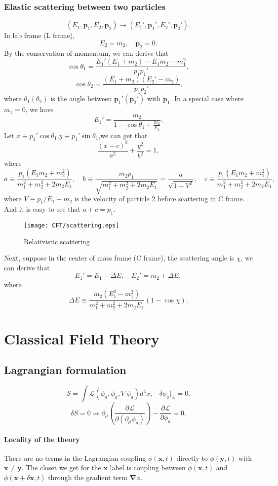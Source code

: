\subsection{Elastic scattering between two particles}
\[(E_1,\bm{p}_1,E_2,\bm{p}_2) \to (E_1',\bm{p}_1',E_2',\bm{p}_2').\]
In lab frame (L frame),
\[E_2 = m_2 , \quad \bm{p}_2 = 0.\]
By the conservation of momentum, we can derive that
\[\cos \theta_1 = \frac{E_1'(E_1+m_2)-E_1 m_2 - m_1^2}{p_1 p_1'},\]
\[\cos \theta_2 = \frac{(E_1+m_2)(E_2'-m_2)}{p_1 p_2'}.\]
where $\theta_1(\theta_2)$ is the angle between $\bm{p}_1'(\bm{p}_2')$ with $\bm{p}_1$.
In a special case where $m_1 =0$, we have
\[E_1' = \frac{m_2}{1-\cos\theta_1 + \frac{m_2}{E_1}}.\]
Let $x \equiv p_1'\cos\theta_1$,$y \equiv p_1'\sin\theta_1$,we can get that
\[\frac{(x-c)^2}{a^2}+\frac{y^2}{b^2}=1,\]
where
\[a \equiv \frac{p_1(E_1m_2+m_2^2)}{m_1^2 + m_2^2 + 2m_2 E_1}, \quad b \equiv \frac{m_2 p_1}{\sqrt{m_1^2 + m_2^2 + 2m_2 E_1}} = \frac{a}{\sqrt{1-V^2}} , \quad c \equiv \frac{ p_1(E_1m_2+m_1^2)}{m_1^2 + m_2^2 + 2m_2 E_1},\]
where $V \equiv p_1 / {E_1 + m_2}$ is the velocity of particle 2 before scattering in C frame. 
And it is easy to see that $a + c = p_1$.
\begin{figure}[!h]
	\centering
	\texttt{[image: CFT/scattering.eps]}
	\caption{Relativistic scattering}
\end{figure}
\noindent
Next, suppose in the center of mass frame (C frame), the scattering angle is $\chi$, we can derive that
\[E_1' = E_1 - \Delta E , \quad E_2' = m_2 + \Delta E,\]
where
\[\Delta E \equiv \frac{m_2(E_1^2-m_1^2)}{m_1^2 + m_2^2 + 2m_2E_1}(1-\cos\chi).\]

\chapter{Classical Field Theory}
\section{Lagrangian formulation}
\[S = \int \mathcal{L}(\phi_a,\dot{\phi}_a,\nabla \phi_a) d^4 x, \ \ \ \ \delta \phi_a |_{\Sigma} = 0.\]
\[\delta S = 0 \Rightarrow \partial_{\mu} \left (\frac{\partial \mathcal{L}}{\partial (\partial_{\mu} \phi_a)} \right ) - \frac{\partial \mathcal{L}}{\partial \phi_a} = 0.\]
\subsubsection{Locality of the theory}
There are no terms in the Lagrangian coupling $\phi(\bm{x},t)$ directly to  $\phi(\bm{y},t)$ with $\bm{x} \neq \bm{y}$. The closet we get for the $\bm{x}$ label is coupling between $\phi(\bm{x},t)$ and $\phi(\bm{x}+\delta\bm{x},t)$ through the gradient term $\bm{\nabla} \phi$.
